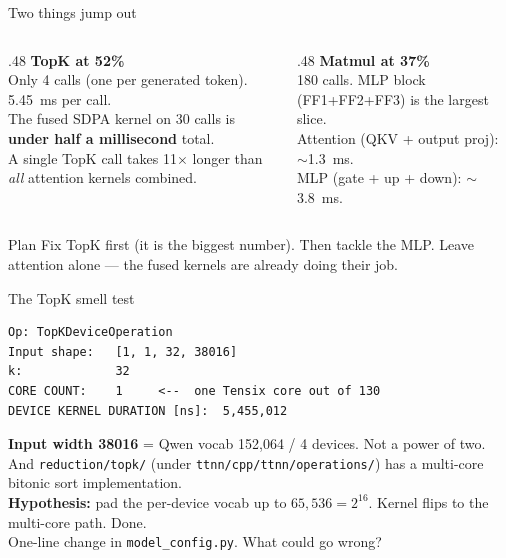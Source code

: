 \documentclass[aspectratio=169,10pt]{beamer}
\begin{document}
\begin{frame}{Two things jump out}
  \begin{columns}[T,onlytextwidth]
    \begin{column}{.48\textwidth}
      \textbf{TopK at 52\%}\\[0.3em]
      Only 4 calls (one per generated token). 5.45~ms per call.\\[0.5em]
      The fused SDPA kernel on 30 calls is \textbf{under half a millisecond} total.\\[0.5em]
      A single TopK call takes 11$\times$ longer than \emph{all} attention kernels combined.
    \end{column}
    \begin{column}{.48\textwidth}
      \textbf{Matmul at 37\%}\\[0.3em]
      180 calls. MLP block (FF1+FF2+FF3) is the largest slice.\\[0.5em]
      Attention (QKV + output proj): $\sim$1.3~ms.\\[0.5em]
      MLP (gate + up + down): $\sim$3.8~ms.
    \end{column}
  \end{columns}
  \vfill
  \begin{block}{Plan}
    Fix TopK first (it is the biggest number). Then tackle the MLP.
    Leave attention alone --- the fused kernels are already doing
    their job.
  \end{block}
\end{frame}

\begin{frame}[fragile]{The TopK smell test}
\begin{lstlisting}
Op: TopKDeviceOperation
Input shape:   [1, 1, 32, 38016]
k:             32
CORE COUNT:    1     <--  one Tensix core out of 130
DEVICE KERNEL DURATION [ns]:  5,455,012
\end{lstlisting}
  \vfill
  \small
  \textbf{Input width 38016} = Qwen vocab 152{,}064 / 4 devices.
  Not a power of two.
  And \texttt{reduction/topk/} (under \texttt{ttnn/cpp/ttnn/operations/})
  has a multi-core bitonic sort implementation.\\[0.3em]
  \textbf{Hypothesis:} pad the per-device vocab up to $65{,}536 = 2^{16}$.
  Kernel flips to the multi-core path. Done.\\[0.3em]
  One-line change in \texttt{model\_config.py}. What could go wrong?
\end{frame}

\end{document}
